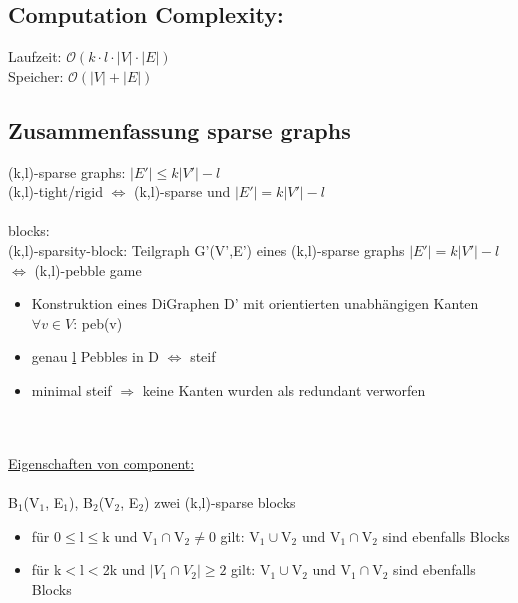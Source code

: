 \documentclass[12pt,a4paper]{article}
\begin{document}

\subsection{Computation Complexity:}
Laufzeit: $\mathcal{O}(k\cdot l\cdot |V|\cdot |E|)$\\
Speicher: $\mathcal{O}(|V| + |E|)$

\subsection{Zusammenfassung sparse graphs}
(k,l)-sparse graphs: $|E'|\leq k|V'|-l$\\
(k,l)-tight/rigid $\Leftrightarrow$ (k,l)-sparse und $|E'|=k|V'|-l$\\\\
blocks:\\
(k,l)-sparsity-block: Teilgraph G'(V',E') eines (k,l)-sparse graphs $|E'|=k|V'|-l$ $\Leftrightarrow$ (k,l)-pebble game\\

\begin{itemize}
	\item Konstruktion eines DiGraphen D' mit orientierten unabhängigen Kanten\\
  $\forall v \in V$: peb(v)
	\item genau \underline{l} Pebbles in D $\Leftrightarrow$ steif
	\item minimal steif $\Rightarrow$ keine Kanten wurden als redundant verworfen
\end{itemize}

\\\\
\underline{Eigenschaften von component:}\\\\
B$_1$(V$_1$, E$_1$), B$_2$(V$_2$, E$_2$) zwei (k,l)-sparse blocks
\begin{itemize}
	\item für 0$\leq$l$\leq$k und V$_1 \cap$V$_2 \neq$0 gilt: V$_1 \cup$V$_2$ und V$_1 \cap$V$_2$ sind ebenfalls Blocks
	\item für k$<$l$<$2k und $|V_1\cap V_2|\geq 2$ gilt: V$_1 \cup$V$_2$ und V$_1 \cap$V$_2$ sind ebenfalls Blocks
\end{itemize}
\end{document}
